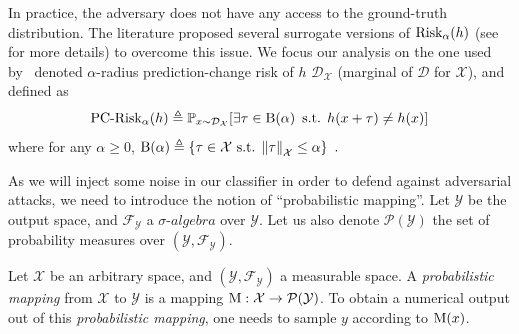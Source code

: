 In practice, the adversary does not have any access to the ground-truth distribution.
The literature proposed several surrogate versions of $\operatorname*{Risk_{\alpha}}(h)$ (see~\citet{diochnos2018adversarial} for more details) to overcome this issue.
We focus our analysis on the one used by~\citet{szegedy2013intriguing,fawzi2018adversarial} denoted $\alpha$-radius prediction-change risk of $h$ \wrt $\mathcal{D}_{\mathcal{X}}$ (marginal of $\mathcal{D}$ for $\mathcal{X}$), and defined as   
\begin{align}
    \PCadvRisk(h) \triangleq \mathbb{P}_{x\sim \mathcal{D}_{\mathcal{X}}}\left[\exists \tau \in \B \text{ s.t. } h(x+\tau)\neq h(x) \right]
\end{align}
where for any $\alpha \geq 0$, \quad $\operatorname*{B(\alpha)} \triangleq \{\tau \in \mathcal{X} \text{ s.t. } \norm{\tau}_{\mathcal{X}} \leq \alpha\}\enspace.$

As we will inject some noise in our classifier in order to defend against adversarial attacks, we need to introduce the notion of ``probabilistic mapping''. Let $\mathcal{Y}$ be the output space, and $\mathcal{F}_{\mathcal{Y}}$ a $\sigma$-$ algebra$ over $\mathcal{Y}$. Let us also denote $\mathcal{P}(\mathcal{Y})$ the set of probability measures over $(\mathcal{Y},\mathcal{F}_{\mathcal{Y}})$.

\begin{definition} Let $\mathcal{X}$ be an arbitrary space, and $(\mathcal{Y},\mathcal{F}_{\mathcal{Y}})$ a measurable space. A \emph{probabilistic mapping} from $\mathcal{X}$ to $\mathcal{Y}$ is a mapping $\operatorname*{M}: \mathcal{X} \to \mathcal{P}(\mathcal{Y})$.
To obtain a numerical output out of this \emph{probabilistic mapping}, one needs to sample $y$ according to $\operatorname*{M}(x)$. %
\end{definition} 

